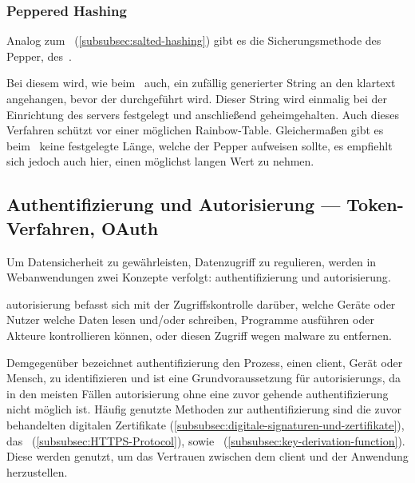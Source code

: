\subsubsection{Peppered Hashing}\label{subsubsec:peppered-hashing}

Analog zum\  (\autoref{subsubsec:salted-hashing}) gibt es die Sicherungsmethode des Pepper, \bzw des\ .

Bei diesem wird, wie beim\  auch, ein zufällig generierter String an den \gls{klartext} angehangen, bevor der  durchgeführt wird.
Dieser String wird einmalig bei der Einrichtung des \glspl{server} festgelegt und anschließend geheimgehalten\autocite[\vglf][]{Securing39:online}.
Auch dieses Verfahren schützt vor einer möglichen \gls{Rainbow-Table}.
Gleichermaßen gibt es beim\  keine festgelegte Länge, welche der Pepper aufweisen sollte, es empfiehlt sich jedoch auch hier, einen möglichst langen Wert zu nehmen.


\subsection[Authentifizierung und Autorisierung]{Authentifizierung und Autorisierung — Token-Verfahren, OAuth}\label{subsec:authenticationAuthorization}
Um Datensicherheit zu gewährleisten, \bzw Datenzugriff zu regulieren, werden in Webanwendungen zwei Konzepte verfolgt: \gls{authentifizierung} und \gls{autorisierung}.

\gls{autorisierung} befasst sich mit der Zugriffskontrolle darüber, welche Geräte oder Nutzer welche Daten lesen und/oder schreiben, Programme ausführen oder Akteure kontrollieren können\autocite[\vglf][]{Auth:2017}, oder diesen Zugriff \zb wegen \gls{malware} zu entfernen.\autocite[\vglf][]{Auth:2017}

Demgegenüber bezeichnet \gls{authentifizierung} den Prozess, einen \gls{client}, Gerät oder Mensch, zu identifizieren und ist eine Grundvoraussetzung für \glspl{autorisierung}, da in den meisten Fällen \gls{autorisierung} ohne eine zuvor gehende \gls{authentifizierung} nicht möglich ist.\autocite[\vglf][]{Auth:2017}
Häufig genutzte Methoden zur \gls{authentifizierung} sind die zuvor behandelten digitalen Zertifikate (\autoref{subsubsec:digitale-signaturen-und-zertifikate}), das\  (\autoref{subsubsec:HTTPS-Protocol}), sowie\  (\autoref{subsubsec:key-derivation-function}).
Diese werden genutzt, um das Vertrauen zwischen dem \gls{client} und der Anwendung herzustellen.\autocite[\vglf][]{Auth:2017}

